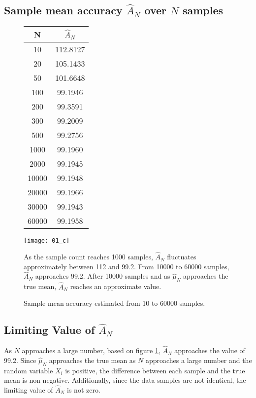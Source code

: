 \documentclass[12pt, a4paper, titlepage, fleqn]{article}
\begin{document}
\subsection{Sample mean accuracy $\hat{A}_N$ over $N$ samples}
\begin{figure}[h!]
	\begin{minipage}{0.25\textwidth}
		\begin{tabular}{| c | c |}
			\hline
			N & $\hat{A}_N$ \\
			\hline
			10 & 112.8127 \\
			20 & 105.1433 \\
			50 & 101.6648 \\
			100 & 99.1946 \\
			200 & 99.3591 \\
			300 & 99.2009 \\
			500 & 99.2756 \\
			1000 & 99.1960 \\
			2000 & 99.1945 \\
			10000 & 99.1948 \\
			20000 &	99.1966 \\
			30000 &	99.1943 \\
			60000 &	99.1958 \\
			\hline
		\end{tabular}
	\end{minipage}
	\begin{minipage}{0.7\textwidth}
		\texttt{[image: 01\_c]}
	\end{minipage}
	\caption{Sample mean accuracy estimated from 10 to 60000 samples.}
	\label{fig:sample mean accuracy}
	\parskip 2pt
	As the sample count reaches 1000 samples, $\hat{A}_N$ fluctuates approximately between 112 and 99.2. From 10000 to 60000 samples, $\hat{A}_N$ approaches 99.2. After 10000 samples and as $\hat{\mu}_N$ approaches the true mean, $\hat{A}_N$ reaches an approximate value.  
\end{figure}

\subsection{Limiting Value of $\hat{A}_N$}
As $N$ approaches a large number, based on figure \ref{fig:sample mean accuracy}, $\hat{A}_N$ approaches the value of 99.2. Since $\hat{\mu}_N$ approaches the true mean as $N$ approaches a large number and the random variable $X_i$ is positive, the difference between each sample and the true mean is non-negative. Additionally, since the data samples are not identical, the limiting value of $\hat{A}_N$ is not zero.
\end{document}
